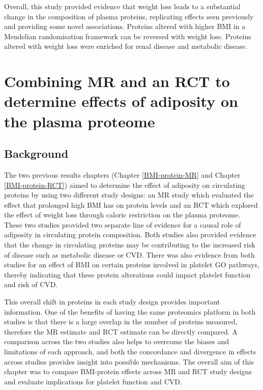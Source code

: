 \documentclass[11pt,twoside]{bristolthesis}
\begin{document}
Overall, this study provided evidence that weight loss leads to a substantial change in the composition of plasma proteins, replicating effects seen previously and providing some novel associations. Proteins altered with higher BMI in a Mendelian randomisation framework can be reversed with weight loss. Proteins altered with weight loss were enriched for renal disease and metabolic disease.

\hypertarget{Comparison-proteome}{%
\chapter{Combining MR and an RCT to determine effects of adiposity on the plasma proteome}\label{Comparison-proteome}}

\hypertarget{background-5}{%
\section{Background}\label{background-5}}

The two previous results chapters (Chapter \ref{BMI-protein-MR} and Chapter \ref{BMI-protein-RCT}) aimed to determine the effect of adiposity on circulating proteins by using two different study designs: an MR study which evaluated the effect that prolonged high BMI has on protein levels and an RCT which explored the effect of weight loss through caloric restriction on the plasma proteome. These two studies provided two separate line of evidence for a causal role of adiposity in circulating protein composition. Both studies also provided evidence that the change in circulating proteins may be contributing to the increased risk of disease such as metabolic disease or CVD. There was also evidence from both studies for an effect of BMI on certain proteins involved in platelet GO pathways, thereby indicating that these protein alterations could impact platelet function and risk of CVD.

This overall shift in proteins in each study design provides important information. One of the benefits of having the same proteomics platform in both studies is that there is a large overlap in the number of proteins measured, therefore the MR estimate and RCT estimate can be directly compared. A comparison across the two studies also helps to overcome the biases and limitations of each approach, and both the concordance and divergence in effects across studies provides insight into possible mechanisms. The overall aim of this chapter was to compare BMI-protein effects across MR and RCT study designs and evaluate implications for platelet function and CVD.
\end{document}

